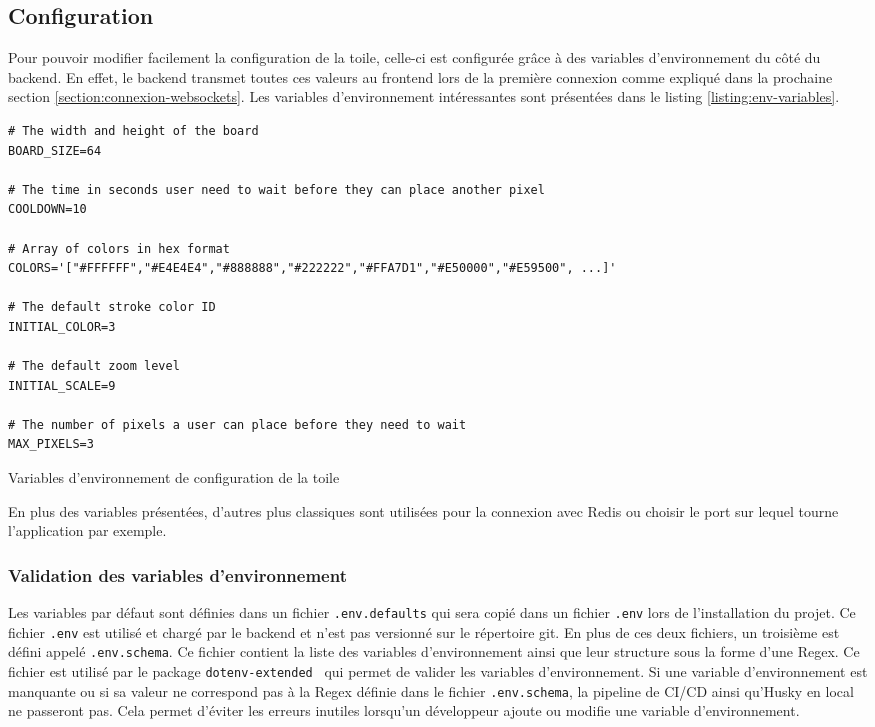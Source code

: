 \subsection{Configuration}

Pour pouvoir modifier facilement la configuration de la toile, celle-ci est configurée grâce à des variables d'environnement du côté du backend. En effet, le backend transmet toutes ces valeurs au frontend lors de la première connexion comme expliqué dans la prochaine section \ref{section:connexion-websockets}. Les variables d'environnement intéressantes sont présentées dans le listing \ref{listing:env-variables}.

\begin{listing}[H]
  \begin{verbatim}
# The width and height of the board
BOARD_SIZE=64

# The time in seconds user need to wait before they can place another pixel
COOLDOWN=10

# Array of colors in hex format
COLORS='["#FFFFFF","#E4E4E4","#888888","#222222","#FFA7D1","#E50000","#E59500", ...]'

# The default stroke color ID
INITIAL_COLOR=3

# The default zoom level
INITIAL_SCALE=9

# The number of pixels a user can place before they need to wait
MAX_PIXELS=3
\end{verbatim}
  \caption{Variables d'environnement de configuration de la toile}
  \label{listing:env-variables}
\end{listing}

En plus des variables présentées, d'autres plus classiques sont utilisées pour la connexion avec Redis ou choisir le port sur lequel tourne l'application par exemple.

\subsubsection{Validation des variables d'environnement}

Les variables par défaut sont définies dans un fichier \texttt{.env.defaults} qui sera copié dans un fichier \texttt{.env} lors de l'installation du projet. Ce fichier \texttt{.env} est utilisé et chargé par le backend et n'est pas versionné sur le répertoire git. En plus de ces deux fichiers, un troisième est défini appelé \texttt{.env.schema}. Ce fichier contient la liste des variables d'environnement ainsi que leur structure sous la forme d'une Regex. Ce fichier est utilisé par le package \texttt{dotenv-extended}~\cite{dotenv-extended} qui permet de valider les variables d'environnement. Si une variable d'environnement est manquante ou si sa valeur ne correspond pas à la Regex définie dans le fichier \texttt{.env.schema}, la pipeline de CI/CD ainsi qu'Husky en local ne passeront pas. Cela permet d'éviter les erreurs inutiles lorsqu'un développeur ajoute ou modifie une variable d'environnement.


